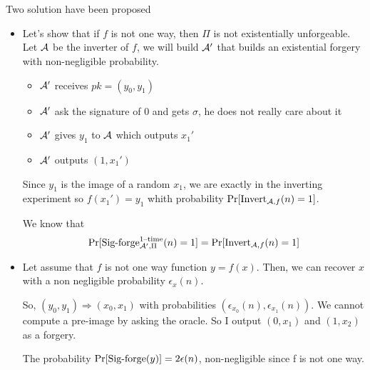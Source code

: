 \section{}
\subsection{}
\begin{solution}
  Two solution have been proposed
  \begin{itemize}
    \item
      Let's show that if $f$ is not one way, then $\Pi$ is not existentially unforgeable.
      Let $\mathcal{A}$ be the inverter of $f$, we will build $\mathcal{A}'$ that builds an existential forgery with non-negligible probability.

      \begin{itemize}
        \item $\mathcal{A}'$ receives $pk = (y_0, y_1)$
        \item $\mathcal{A}'$ ask the signature of 0 and gets $\sigma$, he does not really care about it
        \item $\mathcal{A}'$ gives $y_1$ to $\mathcal{A}$ which outputs $x_1'$
        \item $\mathcal{A}'$ outputs $(1, x_1')$
      \end{itemize}
      Since $y_1$ is the image of a random $x_1$, we are exactly in the inverting experiment so $f(x_1') = y_1$
      whith probability $\Pr[\operatorname{Invert}_{\mathcal{A},f}(n) = 1]$.

      We know that
      \[
        \Pr[\operatorname{Sig-forge}^{\text{1--time}}_{\mathcal{A}',\Pi}(n) = 1] = \Pr[\operatorname{Invert}_{\mathcal{A},f}(n) = 1]
      \]
    \item
      Let assume that $f$ is not one way function $y = f(x)$.
      Then, we can recover $x$ with a non negligible probability $\epsilon_x (n)$.

      So, $(y_0, y_1) \Rightarrow (x_0, x_1)$ with probabilities $(\epsilon_{x_0} (n), \epsilon_{x_1} (n))$.
      We cannot compute a pre-image by asking the oracle. So I output $(0, x_1)$ and $(1, x_2)$ as a forgery.

      The probability $\Pr[\operatorname{Sig-forge}(y)] = 2\epsilon(n)$, non-negligible since f is not one way.
  \end{itemize}
\end{solution}

